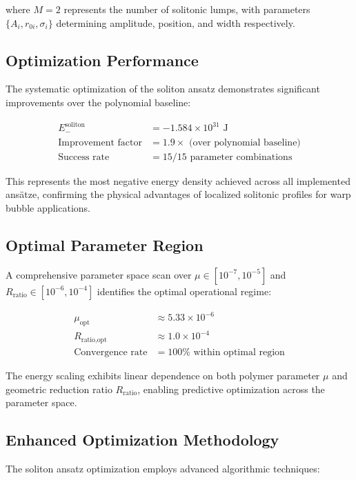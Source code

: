 \documentclass[12pt,a4paper]{article}
\begin{document}
where $M = 2$ represents the number of solitonic lumps, with parameters $\{A_i, r_{0i}, \sigma_i\}$ determining amplitude, position, and width respectively.

\subsection{Optimization Performance}

The systematic optimization of the soliton ansatz demonstrates significant improvements over the polynomial baseline:

\begin{align}
E_{-}^{\text{soliton}} &= -1.584 \times 10^{31} \text{ J} \\
\text{Improvement factor} &= 1.9 \times \text{ (over polynomial baseline)} \\
\text{Success rate} &= 15/15 \text{ parameter combinations}
\end{align}

This represents the most negative energy density achieved across all implemented ansätze, confirming the physical advantages of localized solitonic profiles for warp bubble applications.

\subsection{Optimal Parameter Region}

A comprehensive parameter space scan over $\mu \in [10^{-7}, 10^{-5}]$ and $R_{\text{ratio}} \in [10^{-6}, 10^{-4}]$ identifies the optimal operational regime:

\begin{align}
\mu_{\text{opt}} &\approx 5.33 \times 10^{-6} \\
R_{\text{ratio,opt}} &\approx 1.0 \times 10^{-4} \\
\text{Convergence rate} &= 100\% \text{ within optimal region}
\end{align}

The energy scaling exhibits linear dependence on both polymer parameter $\mu$ and geometric reduction ratio $R_{\text{ratio}}$, enabling predictive optimization across the parameter space.

\subsection{Enhanced Optimization Methodology}

The soliton ansatz optimization employs advanced algorithmic techniques:
\end{document}
